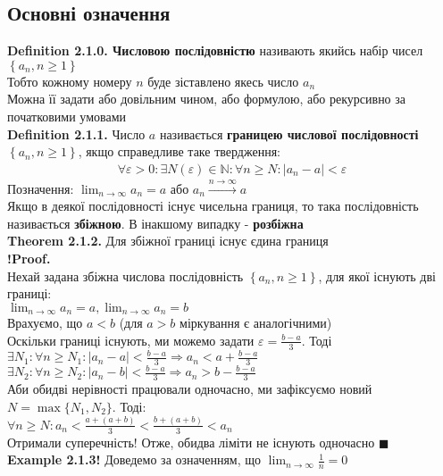 \documentclass[a4paper, 14pt]{extarticle}
\def\bigline{\vspace{5mm}\\}
\def\bigline{\vspace{5mm}\\}
\def\qed{$\blacksquare$}
\def\sequence#1{$\displaystyle \left\{ {#1}, n\geq1 \right\}$}
\begin{document}
	\subsection{Основні означення}
	\textbf{Definition 2.1.0. Числовою послідовністю} називають якийсь набір чисел \sequence{a_n}\\
	Тобто кожному номеру $n$ буде зіставлено якесь число $a_n$\\
	Можна її задати або довільним чином, або формулою, або рекурсивно за початковими умовами
	\bigline
	\textbf{Definition 2.1.1.} Число $a$ називається \textbf{границею числової послідовності} \sequence{a_n}, якщо справедливе таке твердження:
	\begin{align*}
	\forall \varepsilon > 0: \exists N(\varepsilon) \in \mathbb{N}: \forall n \geq N: |a_n - a| < \varepsilon
	\end{align*}
	Позначення: $\displaystyle \lim_{n \to \infty} a_n = a$ або $a_n \overset{n \to \infty}{\longrightarrow} a$\\
	Якщо в деякої послідовності існує чисельна границя, то така послідовність називається \textbf{збіжною}. В інакшому випадку - \textbf{розбіжна}
	\bigline
	\textbf{Theorem 2.1.2.} Для збіжної границі існує єдина границя\\
	\textbf{!Proof.}\\
	Нехай задана збіжна числова послідовність \sequence{a_n}, для якої існують дві границі:\\
	$\displaystyle \lim_{n \to \infty} a_n = a, \lim_{n \to \infty} a_n = b$\\
	Врахуємо, що $a<b$ (для $a>b$ міркування є аналогічними)\\
	Оскільки границі існують, ми можемо задати $\displaystyle \varepsilon = \frac{b-a}{3}$. Тоді\\
	$\displaystyle \exists N_1: \forall n \geq N_1: |a_n-a|< \frac{b-a}{3} \Rightarrow a_n < a + \frac{b-a}{3}$\\
	$\displaystyle \exists N_2: \forall n \geq N_2: |a_n-b|< \frac{b-a}{3} \Rightarrow a_n > b - \frac{b-a}{3}$\\
	Аби обидві нерівності працювали одночасно, ми зафіксуємо новий \\ $N= \max\{N_1,N_2\}$. Тоді:\\
	$\displaystyle \forall n \geq N: a_n < \frac{a+(a+b)}{3} < \frac{b+(a+b)}{3}<a_n$\\
	Отримали суперечність! Отже, обидва ліміти не існують одночасно \qed
	\bigline
	\textbf{Example 2.1.3!} Доведемо за означенням, що $\displaystyle\lim_{n \to \infty} \frac{1}{n} = 0$\\
\end{document}
